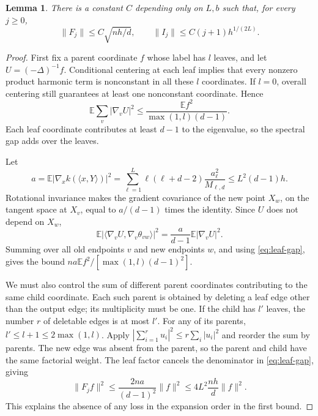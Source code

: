 \documentclass[11pt,reqno]{amsart}
\numberwithin{equation}{section}
\newtheorem{lemma}[theorem]{Lemma}
\theoremstyle{definition}
\theoremstyle{remark}
\theoremstyle{definition}
\begin{document}
\begin{lemma}\label{lem:operators}
There is a constant $C$ depending only on $L,b$ such that, for every $j\ge0$,
\begin{equation}\label{eq:operator-bounds}
 \|F_j\|\le C\sqrt{nh/d},\qquad
 \|I_j\|\le C(j+1)h^{1/(2L)}.
\end{equation}
\end{lemma}
\begin{proof}
First fix a parent coordinate $f$ whose label has $l$ leaves, and let $U=(-\Delta)^{-1}f$.
Conditional centering at each leaf implies that every nonzero product harmonic term is nonconstant in all these $l$ coordinates.
If $l=0$, overall centering still guarantees at least one nonconstant coordinate. Hence
\begin{equation}\label{eq:leaf-gap}
 \mathbb E\sum_v|\nabla_vU|^2
 \le\frac{\mathbb Ef^2}{\max(1,l)(d-1)}.
\end{equation}
Each leaf coordinate contributes at least $d-1$ to the eigenvalue, so the spectral gap adds over the leaves.

Let
\[
 a=\mathbb E|\nabla_x k(\langle x,Y\rangle)|^2
 =\sum_{\ell=1}^L\ell(\ell+d-2)\frac{a_\ell^2}{M_{\ell,d}}
 \le L^2(d-1)h.
\]
Rotational invariance makes the gradient covariance of the new point $X_w$, on the tangent space at $X_v$,
equal to $a/(d-1)$ times the identity. Since $U$ does not depend on $X_w$,
\[
 \mathbb E|\langle\nabla_vU,\nabla_v\theta_{vw}\rangle|^2
 =\frac{a}{d-1}\mathbb E|\nabla_vU|^2.
\]
Summing over all old endpoints $v$ and new endpoints $w$, and using \eqref{eq:leaf-gap}, gives the bound
$na\mathbb Ef^2/[\max(1,l)(d-1)^2]$.

We must also control the sum of different parent coordinates contributing to the same child coordinate.
Each such parent is obtained by deleting a leaf edge other than the output edge; its multiplicity must be one.
If the child has $l'$ leaves, the number $r$ of deletable edges is at most $l'$.
For any of its parents, $l'\le l+1\le2\max(1,l)$.
Apply $|\sum_{i=1}^r u_i|^2\le r\sum_i|u_i|^2$
and reorder the sum by parents.
The new edge was absent from the parent, so the parent and child have the same factorial weight.
The leaf factor cancels the denominator in \eqref{eq:leaf-gap}, giving
\[
 \|F_jf\|^2\le\frac{2na}{(d-1)^2}\|f\|^2
 \le4L^2\frac{nh}{d}\|f\|^2.
\]
This explains the absence of any loss in the expansion order in the first bound.


\end{proof}
\end{document}
